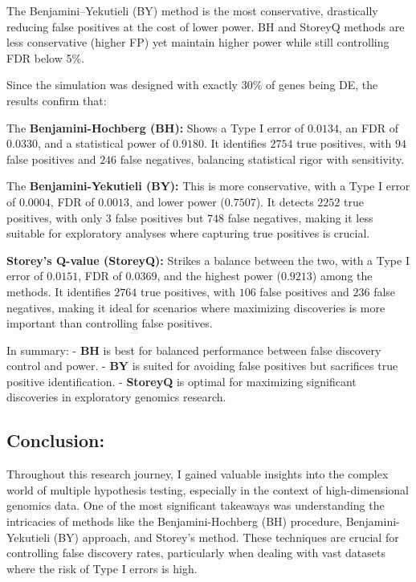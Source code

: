 \documentclass[12pt]{article}
\begin{document}
The Benjamini--Yekutieli (BY) method is the most conservative, drastically reducing false positives at the cost of lower power. BH and StoreyQ methods are less conservative (higher FP) yet maintain higher power while still controlling FDR below 5\%.

Since the simulation was designed with exactly 30\% of genes being DE, the results confirm that:

The \textbf{Benjamini-Hochberg (BH): }  Shows a Type I error of \(0.0134\), an FDR of \(0.0330\), and a statistical power of \(0.9180\). It identifies \(2754\) true positives, with \(94\) false positives and \(246\) false negatives, balancing statistical rigor with sensitivity.

The \textbf{Benjamini-Yekutieli (BY): } This is more conservative, with a Type I error of \(0.0004\), FDR of \(0.0013\), and lower power (\(0.7507\)). It detects \(2252\) true positives, with only \(3\) false positives but \(748\) false negatives, making it less suitable for exploratory analyses where capturing true positives is crucial.

\textbf{Storey’s Q-value (StoreyQ): } Strikes a balance between the two, with a Type I error of \(0.0151\), FDR of \(0.0369\), and the highest power (\(0.9213\)) among the methods. It identifies \(2764\) true positives, with \(106\) false positives and \(236\) false negatives, making it ideal for scenarios where maximizing discoveries is more important than controlling false positives.

In summary:
- \textbf{BH} is best for balanced performance between false discovery control and power.\cite{krawczyk2018fdr}
- \textbf{BY} is suited for avoiding false positives but sacrifices true positive identification.
- \textbf{StoreyQ} is optimal for maximizing significant discoveries in exploratory genomics research.

\subsection*{Conclusion:}
Throughout this research journey, I gained valuable insights into the complex world of multiple hypothesis testing, especially in the context of high-dimensional genomics data. One of the most significant takeaways was understanding the intricacies of methods like the Benjamini-Hochberg (BH) procedure, Benjamini-Yekutieli (BY) approach, and Storey’s method. These techniques are crucial for controlling false discovery rates, particularly when dealing with vast datasets where the risk of Type I errors is high.
\end{document}
